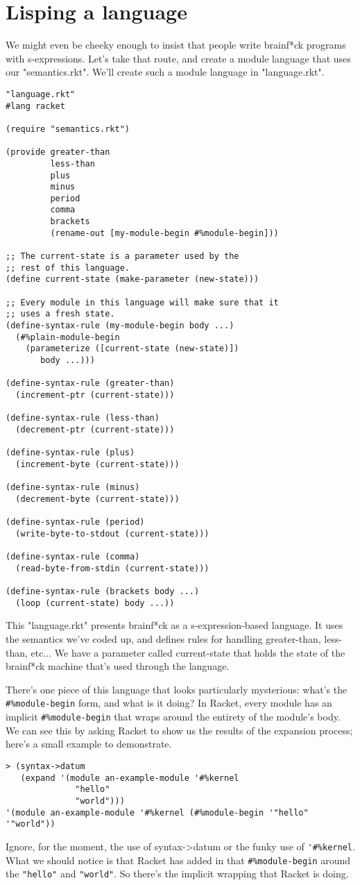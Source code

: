 \documentclass{article}
\begin{document}
\section{Lisping a language}
We might even be cheeky enough to insist that people write brainf*ck programs with s-expressions. Let's take that route, and create a module language that uses our "semantics.rkt". We'll create such a module language in "language.rkt".
\begin{verbatim}
"language.rkt"
#lang racket
 
(require "semantics.rkt")
 
(provide greater-than
         less-than
         plus
         minus
         period
         comma
         brackets
         (rename-out [my-module-begin #%module-begin]))
 
;; The current-state is a parameter used by the
;; rest of this language.
(define current-state (make-parameter (new-state)))
 
;; Every module in this language will make sure that it
;; uses a fresh state.
(define-syntax-rule (my-module-begin body ...)
  (#%plain-module-begin
    (parameterize ([current-state (new-state)])
       body ...)))
 
(define-syntax-rule (greater-than)
  (increment-ptr (current-state)))
 
(define-syntax-rule (less-than)
  (decrement-ptr (current-state)))
 
(define-syntax-rule (plus)
  (increment-byte (current-state)))
 
(define-syntax-rule (minus)
  (decrement-byte (current-state)))
 
(define-syntax-rule (period)
  (write-byte-to-stdout (current-state)))
 
(define-syntax-rule (comma)
  (read-byte-from-stdin (current-state)))
 
(define-syntax-rule (brackets body ...)
  (loop (current-state) body ...))
\end{verbatim}
This "language.rkt" presents brainf*ck as a s-expression-based language. It uses the semantics we've coded up, and defines rules for handling greater-than, less-than, etc... We have a parameter called current-state that holds the state of the brainf*ck machine that's used through the language.

There's one piece of this language that looks particularly mysterious: what's the \verb+#%module-begin+ form, and what is it doing? In Racket, every module has an implicit \verb+#%module-begin+ that wraps around the entirety of the module's body. We can see this by asking Racket to show us the results of the expansion process; here's a small example to demonstrate.
\begin{verbatim}
> (syntax->datum
   (expand '(module an-example-module '#%kernel
              "hello"
              "world")))
'(module an-example-module '#%kernel (#%module-begin '"hello" '"world"))
\end{verbatim}
Ignore, for the moment, the use of syntax->datum or the funky use of \verb+'#%kernel+. What we should notice is that Racket has added in that \verb+#%module-begin+ around the \verb+"hello"+ and \verb+"world"+. So there's the implicit wrapping that Racket is doing.
\end{document}
